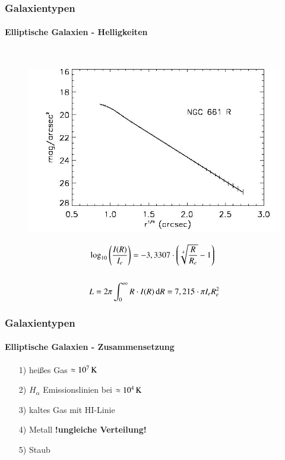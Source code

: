 \begin{frame}
\frametitle{Galaxientypen}
\framesubtitle{Elliptische Galaxien - Helligkeiten}

\hfill \\

\begin{figure}
\includegraphics[scale=0.25]{Helligkeitsprofil_Ellipse.jpg}
\end{figure}


\begin{align*}
&\log_{10} \left( \frac{I(R)}{I_e} \right) = - 3,3307 \cdot \left( \sqrt[4]{\frac{R}{R_e}}  - 1 \right) \\
\hfill \\
&L = 2\pi \int_0^\infty R \cdot I(R) \d R = 7,215 \cdot \pi I_e R_e^2
\end{align*}

\end{frame}


\begin{frame}
\frametitle{Galaxientypen}
\framesubtitle{Elliptische Galaxien - Zusammensetzung}

\begin{itemize}
\item[1)] heißes Gas $\approx \unit[10^7]{K}$ \\
\item[2)] $H_\alpha$ Emissionslinien bei $\approx \unit[10^4]{K}$
\item[3)] kaltes Gas mit HI-Linie
\item[4)] Metall \textbf{!ungleiche Verteilung!}
\item[5)] Staub 
\end{itemize}

\end{frame}


